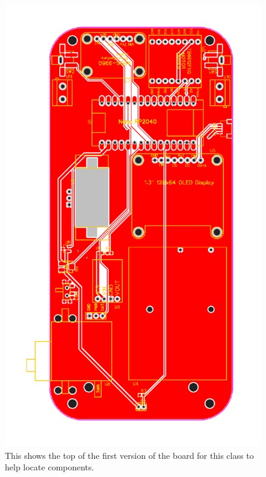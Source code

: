 \begin{figure}[!htb]
	\centering
	\includegraphics{arduinoStart/PCB_PCB_NanoConnectRP2040test1_v0.1} %
	\caption{This shows the top of the first version of the board for this class to help locate components.}
	\label{fig:boardTop}
\end{figure} 
